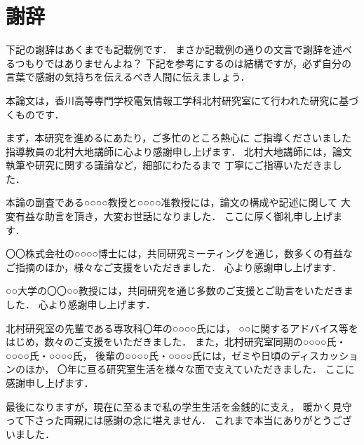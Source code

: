 \chapter{謝辞}

下記の謝辞はあくまでも記載例です．
まさか記載例の通りの文言で謝辞を述べるつもりではありませんよね？
下記を参考にするのは結構ですが，必ず自分の言葉で感謝の気持ちを伝えるべき人間に伝えましょう．

本論文は，香川高等専門学校電気情報工学科北村研究室にて行われた研究に基づくものです．

まず，本研究を進めるにあたり，ご多忙のところ熱心に
ご指導くださいました指導教員の北村大地講師に心より感謝申し上げます．
北村大地講師には，論文執筆や研究に関する議論など，細部にわたるまで
丁寧にご指導いただきました．

本論の副査である○○○○教授と○○○○准教授には，論文の構成や記述に関して
大変有益な助言を頂き，大変お世話になりました．
ここに厚く御礼申し上げます．

〇〇株式会社の○○○○博士には，共同研究ミーティングを通じ，数多くの有益な
ご指摘のほか，様々なご支援をいただきました．
心より感謝申し上げます．

○○大学の〇〇○○教授には，共同研究を通じ多数のご支援とご助言をいただきました．
心より感謝申し上げます．

北村研究室の先輩である専攻科〇年の○○○○氏には，
○○に関するアドバイス等をはじめ，数々のご支援をいただきました．
また，北村研究室同期の○○○○氏・○○○○氏・○○○○氏，
後輩の○○○○氏・○○○○氏には，ゼミや日頃のディスカッションのほか，
〇年に亘る研究室生活を様々な面で支えていただきました．
ここに感謝申し上げます．

最後になりますが，現在に至るまで私の学生生活を金銭的に支え，
暖かく見守って下さった両親には感謝の念に堪えません．
これまで本当にありがとうございました．
